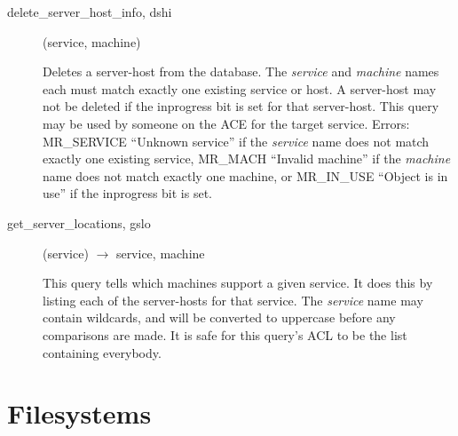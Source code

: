 \begin{description}
\item[delete\_server\_host\_info, dshi](service, machine)

Deletes a server-host from the database.  The {\em service} and
{\em machine} names each must match exactly one existing service or
host.  A server-host may not be deleted if the inprogress bit is set
for that server-host.  This query may be used by someone on the ACE
for the target service.  Errors: MR\_SERVICE ``Unknown service'' if the
{\em service} name does not match exactly one existing service, MR\_MACH
``Invalid machine'' if the {\em machine} name does not match exactly one
machine, or MR\_IN\_USE ``Object is in use'' if the inprogress bit is
set.

\item[get\_server\_locations, gslo](service) $\rightarrow$ service, machine

This query tells which machines support a given service.  It does this
by listing each of the server-hosts for that service.  The {\em service}
name may contain wildcards, and will be converted to uppercase before
any comparisons are made.  It is safe for this query's ACL to be the
list containing everybody.

\end{description}

\section{Filesystems}

